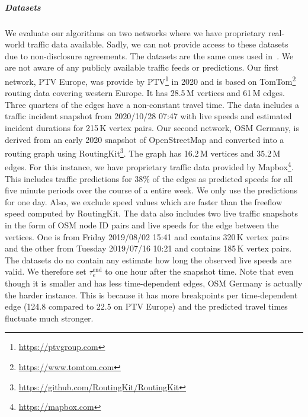 \documentclass[a4paper,UKenglish,cleveref, autoref, thm-restate]{lipics-v2021}
\begin{document}
\subparagraph{Datasets}
We evaluate our algorithms on two networks where we have proprietary real-world traffic data available.
Sadly, we can not provide access to these datasets due to non-disclosure agreements.
The datasets are the same ones used in~\cite{swz-sfert-21,strasser_et_al:LIPIcs.SEA.2021.6}.
We are not aware of any publicly available traffic feeds or predictions.
%
Our first network, PTV Europe, was provide by PTV\footnote{\url{https://ptvgroup.com}} in 2020 and is based on TomTom\footnote{\url{https://www.tomtom.com}} routing data covering western Europe.
It has 28.5\,M vertices and 61\,M edges.
Three quarters of the edges have a non-constant travel time.
The data includes a traffic incident snapshot from 2020/10/28 07:47 with live speeds and estimated incident durations for 215\,K vertex pairs.
%
Our second network, OSM Germany, is derived from an early 2020 snapshot of OpenStreetMap and converted into a routing graph using RoutingKit\footnote{\url{https://github.com/RoutingKit/RoutingKit}}.
The graph has 16.2\,M vertices and 35.2\,M edges.
For this instance, we have proprietary traffic data provided by Mapbox\footnote{\url{https://mapbox.com}}.
This includes traffic predictions for 38\% of the edges as predicted speeds for all five minute periods over the course of a entire week.
We only use the predictions for one day.
Also, we exclude speed values which are faster than the freeflow speed computed by RoutingKit.
The data also includes two live traffic snapshots in the form of OSM node ID pairs and live speeds for the edge between the vertices.
One is from Friday 2019/08/02 15:41 and contains 320\,K vertex pairs and the other from Tuesday 2019/07/16 10:21 and contains 185\,K vertex pairs.
The datasets do no contain any estimate how long the observed live speeds are valid.
We therefore set $\tau_e^{\operatorname{end}}$ to one hour after the snapshot time.
Note that even though it is smaller and has less time-dependent edges, OSM Germany is actually the harder instance.
This is because it has more breakpoints per time-dependent edge (124.8 compared to 22.5 on PTV Europe) and the predicted travel times fluctuate much stronger.
\end{document}

